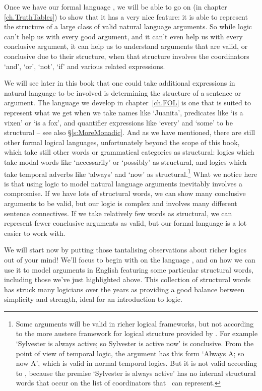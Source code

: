 Once we have our formal language \TFL, we will be able to go on (in chapter \ref{ch.TruthTables}) to show that it has a very nice feature: it is able to represent the structure of a large class of valid natural language arguments. So while logic can't help us with every good argument, and it can't even help us with every conclusive argument, it can help us to understand arguments that are valid, or conclusive due to their structure, when that structure involves the coordinators `and', `or', `not', `if' and various related expressions. 

We will see later in this book that one could take additional  expressions in natural language to be involved is determining the structure of a sentence or argument. The language we develop in chapter~\ref{ch.FOL} is one that is suited to represent what we get when we take names like `Juanita', predicates like `is a vixen' or `is a fox', and quantifier expressions like `every' and `some' to be structural – see also §\ref{s:MoreMonadic}. And as we have mentioned, there are still other formal logical languages, unfortunately beyond the scope of this book, which take still other words or grammatical categories as structural: logics which take modal words like `necessarily' or `possibly' as structural, and logics which take temporal adverbs like `always' and `now' as structural.\footnote{Some arguments will be valid in richer logical frameworks, but not according to the more austere framework for logical structure provided by \TFL. For example `Sylvester is always active; so Sylvester is active now' is conclusive. From the point of view of temporal logic, the argument has this form `Always A; so now A', which is valid in normal temporal logics. But it is not valid according to \TFL, because the premise `Sylvester is always active' has no internal structural words that occur on the list of coordinators that \TFL\ can represent.} What we notice here is that using logic to model natural language arguments inevitably involves a compromise. If we have lots of structural words, we can show many conclusive arguments to be valid, but our logic is complex and involves many different sentence connectives. If we take relatively few words as structural, we can represent fewer conclusive arguments as valid, but our formal language is a lot easier to work with. 

We will start now by putting those tantalising observations about richer logics out of your mind! We'll focus to begin with on the language \TFL, and on how we can use it to model arguments in English featuring some particular structural words, including those we've just highlighted above. This collection of structural words has struck many logicians over the years as providing a good balance between simplicity and strength, ideal for an introduction to logic.



